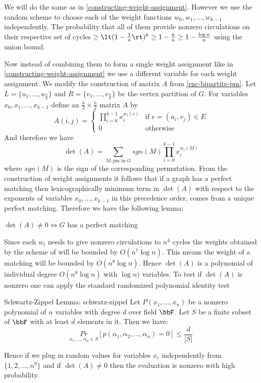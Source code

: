 We will do the same as in \autoref{constructing-weight-assignment}. However we use the random scheme  to choose each of the weight functions $w_0,w_1,\dots, w_{k-1}$ independently. The probability that all of them provide nonzero circulations on their respective set of cycles $\geq \lt(1-\frac1n \rt)^k\geq 1-\frac{k}{n}\geq 1-\frac{\log n}{n}$ using the union bound.

Now instead of combining them to form a single weight assignment like in \autoref{constructing-weight-assignment} we use a different variable for each weight assignment. We modify the construction of matrix $A$ from \autoref{rnc-bipartite-pm}. Let $L=\{u_1,\dots, u_{\frac{n}2}\}$ and $R=\{v_1,\dots, v_{\frac{n}2}\}$ be the vertex partition of $G$. For variables $x_0,x_1,\dots, x_{k-1}$ define an $\frac{n}2\times \frac{n}2$ matrix $A$ by \[
	A(i,j)=\begin{cases}
		\prod\limits_{i=0}^{k-1} x_i^{w_i(e)} & \text{if $e=(u_i,v_j)\in E$} \\
		0                                     & \text{otherwise}
	\end{cases}
\]
And therefore we have $$\det(A)=\sum\limits_{M: \text{pm in $G$}}^{} sgn(M)\prod\limits_{i=0}^{k-1} x_i^{w_i(M)}  $$ where $sgn(M)$ is the sign of the corresponding permutation. From the construction of weight assignments it follows that if a graph has a perfect matching then lexicographically minimum term in $\det(A)$ with respect to the exponents of variables $x_0,\dots, x_{k-1}$ in this precedence order, comes from a unique perfect matching. Therefore we have the following lemma:
\begin{lemma}{}{}
	$\det(A)\neq 0\iff G$ has a perfect matching
\end{lemma}

Since each $w_i$ needs to give nonzero circulations to $n^4	$ cycles the weights obtained by the scheme of  will be bounded by $O(n^7\log n)$. This means the weight of a matching will be bounded by $O(n^8\log n)$. Hence $\det(A)$ is a polynomial of individual degree $O(n^8\log n)$ with $\log n)$ variables. To test if $\det(A)$ is nonzero one can apply the standard randomized polynomial identity test
\begin{Theorem}{Schwartz-Zippel Lemma: \cite{Schwartz_1980_FPA,Zippel_1979}}{schwatz-zippel}
	Let $P(x_1,\dots, x_n)$ be a nonzero polynomial of $n$ variables with degree $d$ over field $\bbF$.  Let $S$ be a finite subset of $\bbF$  with at least $d$ elements in it. Then we have: \[
		\underset{\alpha_1,\dots, \alpha_n\in S}{Pr}[{p(\alpha_1,\alpha_2,\dots,\alpha_n)=0}]\leq \frac{d}{|S|}
	\]
\end{Theorem}
Hence if we plug in random values for variables $x_i$ independently from $\{1,2,\dots, n^9\}$ and if $\det(A)\neq 0$ then the evaluation is nonzero with high probability.\parinf\vspace{3mm}

